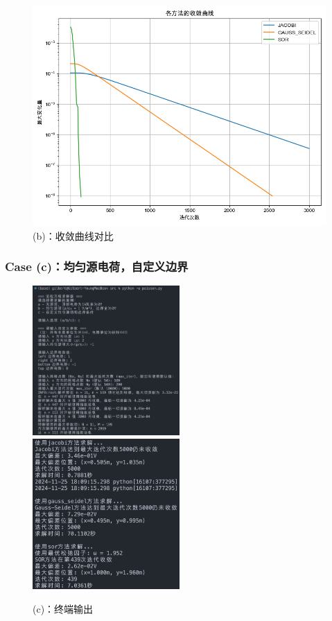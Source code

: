 \begin{figure}[H]
    \centering
    \includegraphics[width=1.0\textwidth]{Problem_1/figs/b_convergence.png}
    \caption{(b)：收敛曲线对比}
\end{figure}

\subsubsection{Case (c)：均匀源电荷，自定义边界}
\begin{figure}[H]
    \centering
    \includegraphics[width=0.5\textwidth]{Problem_1/figs/c_terminal_1.png}
    \includegraphics[width=0.5\textwidth]{Problem_1/figs/c_terminal_2.png}
    \caption{(c)：终端输出}
\end{figure}

